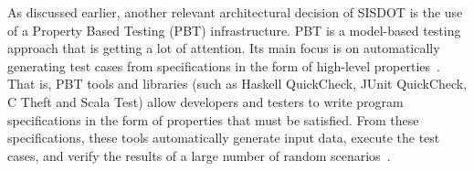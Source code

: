 As discussed earlier, another relevant architectural decision of
SISDOT is the use of a Property Based Testing (PBT) infrastructure.
PBT is a model-based testing approach that is getting a lot of attention.
Its main focus is on automatically generating test cases from specifications in the form of high-level
properties~\cite{claessen2000,earle2014,castro2015}. That is, PBT tools and libraries (such as Haskell QuickCheck,
JUnit QuickCheck, C Theft and Scala Test) allow developers and testers to write
program specifications in the form of properties that must be satisfied. From these specifications,
these tools automatically generate input data, execute the test cases, and verify the results of a
large number of random scenarios~\cite{castro2015}.





